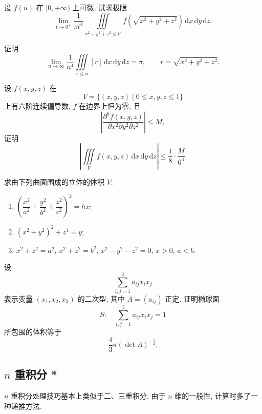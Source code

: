 \documentclass[../../数学分析培优讲义.tex]{subfiles}
\begin{document}
\begin{example}
设 $f(u)$ 在 $\lbrack0,+\infty)$ 上可微, 试求极限
\[
    \lim\limits_{t\to0^+}\dfrac{1}{\pi t^4}
    \iiint\limits_{x^2+y^2+z^2\leq t^2}
    f\left(\sqrt{x^2+y^2+z^2}\right)\,\mathrm{d}x\,\mathrm{d}y\,\mathrm{d}z.
\]
\end{example}
\exampleblank

\begin{example}[\markstar]
证明
\[
    \lim\limits_{n\to\infty}\dfrac{1}{n^4}
    \iiint\limits_{r\leq n}[r]\,\mathrm{d}x\,\mathrm{d}y\,\mathrm{d}z=\pi,
    \qquad r=\sqrt{x^2+y^2+z^2}.
\]
\end{example}
\exampleblank

\begin{example}
设 $f(x,y,z)$ 在
\[
    V=\{(x,y,z)\mid0\leq x,y,z\leq1\}
\]
上有六阶连续偏导数, $f$ 在边界上恒为零, 且
\[
    \left|\dfrac{\partial^6f(x,y,z)}{\partial x^2\partial y^2\partial z^2}\right|\leq M,
\]
证明
\[
    \left|\iiint\limits_Vf(x,y,z)\,\mathrm{d}x\,\mathrm{d}y\,\mathrm{d}z\right|
    \leq\dfrac{1}{8}\cdot\dfrac{M}{6^3}.
\]
\end{example}
\exampleblank

\begin{example}
求由下列曲面围成的立体的体积 $V$:
\begin{enumerate}[label=(\arabic*)]
    \item $\left(\dfrac{x^2}{a^2}+\dfrac{y^2}{b^2}+\dfrac{z^2}{c^2}\right)^2=hx$;
    \item $(x^2+y^2)^2+z^4=y$;
    \item $x^2+z^2=a^2$, $x^2+z^2=b^2$, $x^2-y^2-z^2=0$, $x>0$, $a<b$.
\end{enumerate}
\end{example}
\exampleblank

\begin{example}[\markstar]
设
\[
    \sum\limits_{i,j=1}^3a_{ij}x_ix_j
\]
表示变量 $(x_1,x_2,x_3)$ 的二次型, 其中 $A=(a_{ij})$ 正定. 证明椭球面
\[
    S:\quad\sum\limits_{i,j=1}^3a_{ij}x_ix_j=1
\]
所包围的体积等于
\[
    \dfrac{4}{3}\pi(\det A)^{-\frac{1}{2}}.
\]
\end{example}
\exampleblank



\subsection{\texorpdfstring{$n$}{n} 重积分 *}

$n$ 重积分处理技巧基本上类似于二、三重积分, 由于 $n$ 维的一般性, 计算时多了一种递推方法.
\end{document}
